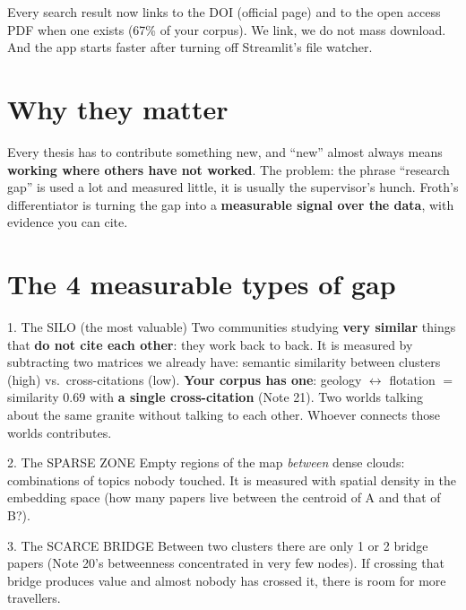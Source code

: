 \documentclass[11pt,a4paper]{article}
\begin{document}
\begin{resumen}
Every search result now links to the DOI (official page) and to the open access PDF when one
exists (67\% of your corpus). We link, we do not mass download. And the app starts faster after
turning off Streamlit's file watcher.
\end{resumen}
\clearpage
{}
{}

\section{Why they matter}

Every thesis has to contribute something new, and ``new'' almost always means \textbf{working
where others have not worked}. The problem: the phrase ``research gap'' is used a lot and
measured little, it is usually the supervisor's hunch. Froth's differentiator is turning the
gap into a \textbf{measurable signal over the data}, with evidence you can cite.

\section{The 4 measurable types of gap}

\begin{concepto}{1. The SILO (the most valuable)}
Two communities studying \textbf{very similar} things that \textbf{do not cite each other}:
they work back to back. It is measured by subtracting two matrices we already have: semantic
similarity between clusters (high) vs.\ cross-citations (low). \textbf{Your corpus has one}:
geology $\leftrightarrow$ flotation $=$ similarity 0.69 with \textbf{a single cross-citation}
(Note 21). Two worlds talking about the same granite without talking to each other. Whoever
connects those worlds contributes.
\end{concepto}

\begin{concepto}{2. The SPARSE ZONE}
Empty regions of the map \emph{between} dense clouds: combinations of topics nobody touched.
It is measured with spatial density in the embedding space (how many papers live between the
centroid of A and that of B?).
\end{concepto}

\begin{concepto}{3. The SCARCE BRIDGE}
Between two clusters there are only 1 or 2 bridge papers (Note 20's betweenness concentrated
in very few nodes). If crossing that bridge produces value and almost nobody has crossed it,
there is room for more travellers.
\end{concepto}
\end{document}
